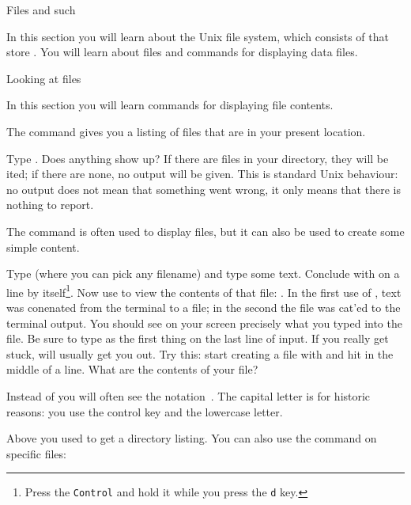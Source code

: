 
 {Files and such}

\begin{purpose}
In this section you will learn about the Unix file system, which
consists of  that store . You
will learn about  files and commands for
displaying data files.
\end{purpose}

 {Looking at files}

\begin{purpose}
In this section you will learn commands for displaying file contents.
\end{purpose}

The  command gives you a listing of files that are in your
present location. 

\practical
{Type . Does anything show up?}
{If there are files in your directory, they will be ited; if
  there are none, no output will be given. This is standard Unix
  behaviour: no output does not mean that something went wrong, it
  only means that there is nothing to report.}{}

The  command is often used to display files, but it can also be
used to create some simple content. 

\practical
{Type  (where you can pick any
  filename) and type some text. Conclude with 
  on a line by itself\footnote 
  {Press the \texttt{Control} and hold it while you press the \texttt{d} key.}.
  Now use  to view the contents of that file: .}
{In the first use of , text was conenated from the
  terminal to a file; in the second the file was cat'ed to the
  terminal output. You should see on your screen precisely what you
  typed into the file.}
{Be sure to type  as the first thing on the last line of input. If you
  really get stuck,  will usually get you out. Try this:
  start creating a file with  and hit  in
  the middle of a line. What are the contents of your file?}

  \begin{remark}
  Instead of  you will often see the notation~. 
  The capital letter is for historic reasons: you use the control key
  and the lowercase letter.
  \end{remark}

Above you used  to get a directory listing. You can also use the
 command on specific files: 

